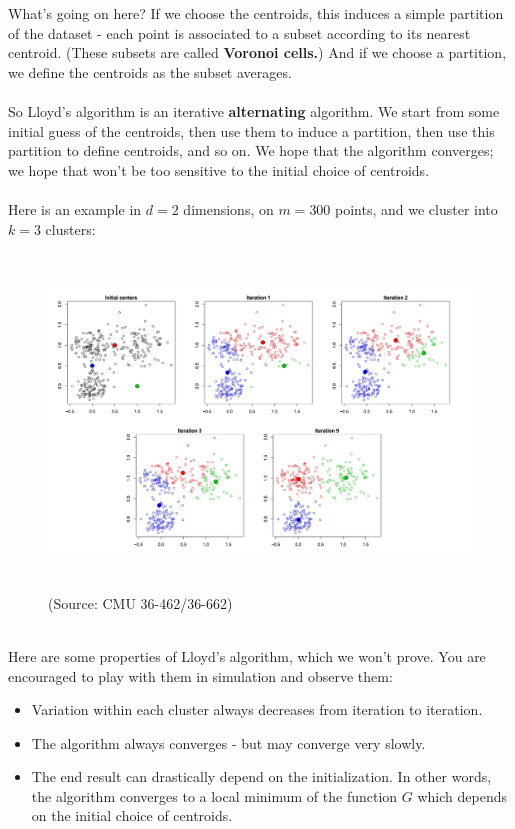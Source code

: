 \documentclass[11pt]{article}
\begin{document}
What's going on here? 
If we choose the centroids, this induces a simple partition of the dataset -
each point is associated to a subset according to its nearest centroid. (These
  subsets are 
called {\bf Voronoi cells.}) And if we choose a partition, we define the
centroids as the subset averages. 
\\~\\
So Lloyd's algorithm is an iterative {\bf alternating} algorithm. 
We start from some initial
guess of the centroids, then use them to induce a partition, then use this
partition to define centroids, and so on. We hope that the algorithm converges;
we hope that won't be too sensitive to the initial choice of centroids.
\\~\\
Here is an example in  $d=2$ dimensions, on $m=300$ points, and we cluster into
$k=3$ clusters: 
\begin{figure}[H]
      \centering
      \includegraphics[height=3.5in]{kmeans.jpeg}        
      \caption{(Source: CMU 36-462/36-662)}
    \end{figure}
~\\ 
Here are some properties of Lloyd's algorithm, which we won't prove. You are
encouraged to play with them in simulation and observe them:
    \begin{itemize}
        \item Variation within each cluster always decreases from iteration to
          iteration.
        \item The algorithm always converges - but may converge very slowly.
        \item The end result can drastically depend on the initialization.
          In other words, the algorithm converges to a local minimum of the
          function $G$ which depends on the initial choice of centroids. 
        \end{itemize}
\end{document}
